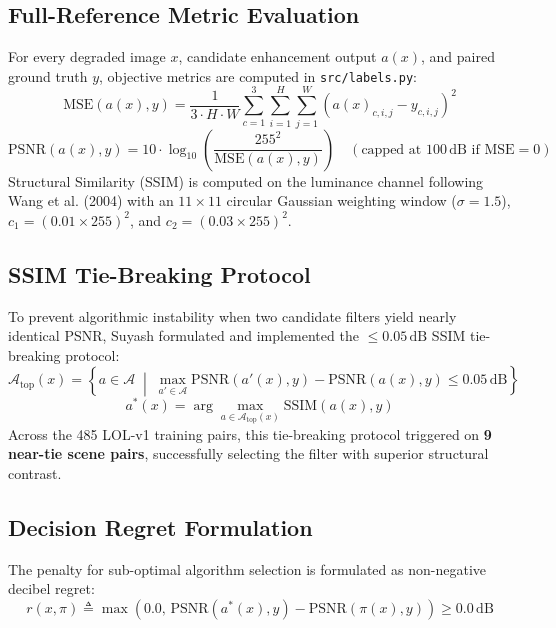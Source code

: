 \documentclass[10pt,a4paper]{article}
\begin{document}
\subsection{Full-Reference Metric Evaluation}
For every degraded image $x$, candidate enhancement output $a(x)$, and paired ground truth $y$, objective metrics are computed in \texttt{src/labels.py}:
\begin{equation}
    \text{MSE}(a(x), y) = \frac{1}{3 \cdot H \cdot W} \sum_{c=1}^3 \sum_{i=1}^H \sum_{j=1}^W \left(a(x)_{c,i,j} - y_{c,i,j}\right)^2
\end{equation}
\begin{equation}
    \text{PSNR}(a(x), y) = 10 \cdot \log_{10}\left(\frac{255^2}{\text{MSE}(a(x), y)}\right) \quad (\text{capped at } 100\,\text{dB if MSE} = 0)
\end{equation}
Structural Similarity (SSIM) is computed on the luminance channel following Wang et al. (2004) with an $11 \times 11$ circular Gaussian weighting window ($\sigma = 1.5$), $c_1 = (0.01 \times 255)^2$, and $c_2 = (0.03 \times 255)^2$.

\subsection{SSIM Tie-Breaking Protocol}
To prevent algorithmic instability when two candidate filters yield nearly identical PSNR, Suyash formulated and implemented the $\le 0.05\,\text{dB}$ SSIM tie-breaking protocol:
\begin{equation}
    \mathcal{A}_{\text{top}}(x) = \left\{ a \in \mathcal{A} \;\middle|\; \max_{a' \in \mathcal{A}} \text{PSNR}(a'(x), y) - \text{PSNR}(a(x), y) \le 0.05\,\text{dB} \right\}
\end{equation}
\begin{equation}
    a^*(x) = \arg\max_{a \in \mathcal{A}_{\text{top}}(x)} \text{SSIM}(a(x), y)
\end{equation}
Across the 485 LOL-v1 training pairs, this tie-breaking protocol triggered on \textbf{9 near-tie scene pairs}, successfully selecting the filter with superior structural contrast.

\subsection{Decision Regret Formulation}
The penalty for sub-optimal algorithm selection is formulated as non-negative decibel regret:
\begin{equation}
    r(x, \pi) \triangleq \max\left(0.0, \, \text{PSNR}(a^*(x), y) - \text{PSNR}(\pi(x), y)\right) \ge 0.0\,\text{dB}
\end{equation}
\end{document}
